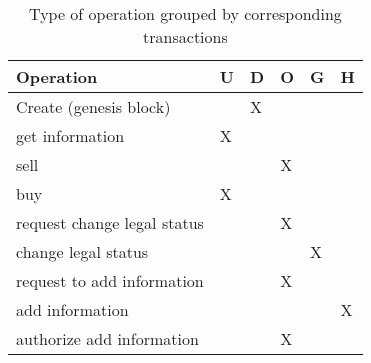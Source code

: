 \begin{table}[htb]
\footnotesize
    \begin{center}
    \caption{Type of operation grouped by corresponding transactions}
    \label{table:operations}
        \begin{tabular}{|l|l|l|l|l|l|}
        \hline
        \textbf{Operation}          &\textbf{U}& \textbf{D}&\textbf{O}& \textbf{G}& \textbf{H}\\ \hline\hline
        Create (genesis block)      &          & X         &          &           &           \\ \hline\hline
        get information             & X        &           &          &           &           \\ \hline\hline
        sell                        &          &           & X        &           &           \\ \hline
        buy                         & X        &           &          &           &           \\ \hline\hline
        request change legal status &          &           & X        &           &           \\ \hline
        change legal status         &          &           &          & X         &           \\ \hline\hline
        request to add information  &          &           & X        &           &           \\ \hline
        add information             &          &           &          &           & X         \\ \hline
        authorize add information   &          &           & X        &           &           \\ \hline
        \end{tabular}
    \end{center}
\end{table}